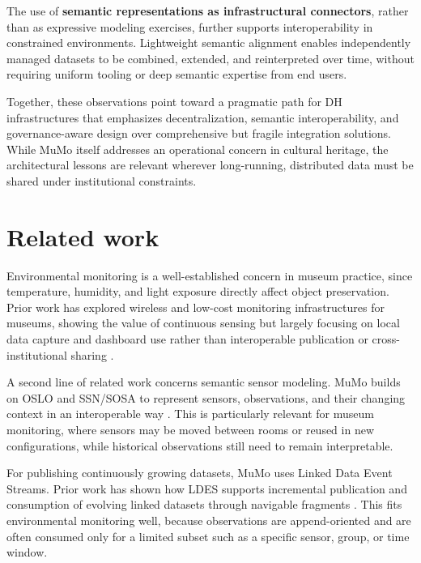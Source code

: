 \documentclass{ceurart}
\begin{document}
The use of \textbf{semantic representations as infrastructural
connectors}, rather than as expressive modeling exercises, further
supports interoperability in constrained environments. Lightweight
semantic alignment enables independently managed datasets to be
combined, extended, and reinterpreted over time, without requiring
uniform tooling or deep semantic expertise from end users.

Together, these observations point toward a pragmatic path for DH
infrastructures that emphasizes decentralization, semantic
interoperability, and governance-aware design over comprehensive but
fragile integration solutions. While MuMo itself addresses an
operational concern in cultural heritage, the architectural lessons are
relevant wherever long-running, distributed data must be shared under
institutional constraints.

\section{Related work}\label{sec:related}

Environmental monitoring is a well-established concern in museum
practice, since temperature, humidity, and light exposure directly
affect object preservation. Prior work has explored wireless and
low-cost monitoring infrastructures for museums, showing the value of
continuous sensing but largely focusing on local data capture and
dashboard use rather than interoperable publication or
cross-institutional sharing
\citep{laborda2022concept, rodriguez2010integrating}.

A second line of related work concerns semantic sensor modeling. MuMo
builds on OSLO and SSN/SOSA to represent sensors, observations, and
their changing context in an interoperable way
\citep{buyle2016oslo, compton2012ssn, ssn-sosa}. This is particularly
relevant for museum monitoring, where sensors may be moved between rooms
or reused in new configurations, while historical observations still
need to remain interpretable.

For publishing continuously growing datasets, MuMo uses Linked Data
Event Streams. Prior work has shown how LDES supports incremental
publication and consumption of evolving linked datasets through
navigable fragments \citep{vanlancker2021ldes, slabbinck2023linked}.
This fits environmental monitoring well, because observations are
append-oriented and are often consumed only for a limited subset such as
a specific sensor, group, or time window.
\end{document}
